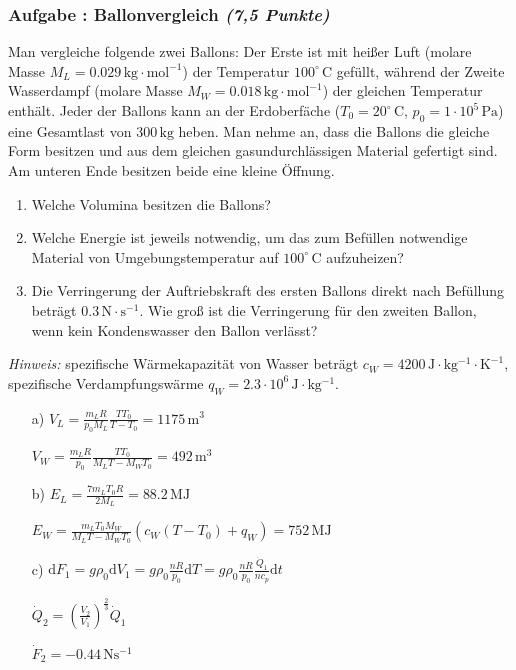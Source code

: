 \documentclass[12pt,a4paper]{article}
\newcommand{\ee}[1]{\cdot 10^{#1}}
\newcommand{\unit}[1]{\,\mathrm{#1}}
\newcommand{\dif}{\mathrm{d}}
\newcommand{\hinweis}{\emph{Hinweis:} }
\newenvironment{abcenum}{\renewcommand{\labelenumi}{(\alph{enumi})} \begin{enumerate}}{\end{enumerate}\renewcommand{\labelenumi}{\theenumi .}}
\newcounter{numlabel}
\newenvironment{problem}[2]{\stepcounter{numlabel} \vspace{1ex} \subsubsection*{Aufgabe \the\value{numlabel}: #1 \emph{(#2 Punkte)}} \renewcommand{\Currentlabel}{Aufgabe \the\value{numlabel}: #1}}{

}
\begin{document}
\begin{problem}{Ballonvergleich}{7,5}
Man vergleiche folgende zwei Ballons: Der Erste ist mit heißer Luft (molare Masse $M_L = 0.029 \unit{kg \cdot mol^{-1}}$) der Temperatur $100^\circ \unit{C}$ gefüllt, während der Zweite Wasserdampf (molare Masse $M_W = 0.018 \unit{kg \cdot mol^{-1}}$) der gleichen Temperatur enthält. Jeder der Ballons kann an der Erdoberfäche ($T_0 = 20^\circ \unit{C}$, $p_0 = 1 \ee{5} \unit{Pa}$) eine Gesamtlast von $300 \unit{kg}$ heben. Man nehme an, dass die Ballons die gleiche Form besitzen und aus dem gleichen gasundurchlässigen Material gefertigt sind. Am unteren Ende besitzen beide eine kleine Öffnung.
\begin{abcenum}
 \item Welche Volumina besitzen die Ballons?
 \item Welche Energie ist jeweils notwendig, um das zum Befüllen notwendige Material von Umgebungstemperatur auf $100^\circ \unit{C}$ aufzuheizen?
 \item Die Verringerung der Auftriebskraft des ersten Ballons direkt nach Befüllung beträgt $0.3 \unit{N \cdot s^{-1}}$. Wie groß ist die Verringerung für den zweiten Ballon, wenn kein Kondenswasser den Ballon verlässt?
\end{abcenum}
\hinweis spezifische Wärmekapazität von Wasser beträgt $c_W = 4200 \unit{J \cdot kg^{-1} \cdot K^{-1}}$, spezifische Verdampfungswärme $q_W = 2.3 \ee{6} \unit{J \cdot kg^{-1}}$.

\begin{solution}
\begin{itemize}
 \item[a)] $V_L = \frac{m_L R}{p_0 M_L}\frac{TT_0}{T-T_0}=1175 \unit{m^3}$
 \item[]   $V_W = \frac{m_L R}{p_0}\frac{TT_0}{M_L T-M_W T_0}=492 \unit{m^3}$
 \item[b)] $E_L = \frac{7 m_L T_0 R}{2 M_L} = 88.2 \unit{MJ}$
 \item[]   $E_W = \frac{m_L T_0 M_W}{M_L T-M_W T_0} (c_W (T-T_0)+q_W) = 752 \unit{MJ}$
 \item[c)] $\dif F_1=g \rho_0 \dif V_1=g \rho_0 \frac{nR}{p_0} \dif T=g \rho_0 \frac{nR}{p_0} \frac{\dot{Q}_1}{n c_p} \dif t$
 \item[]   $\dot{Q}_2=\left( \frac{V_2}{V_1} \right)^\frac 23 \dot{Q}_1$
 \item[]   $\dot{F}_2=-0.44 \unit{Ns^{-1}}$
\end{itemize}
\end{solution}
\end{problem}
\end{document}
